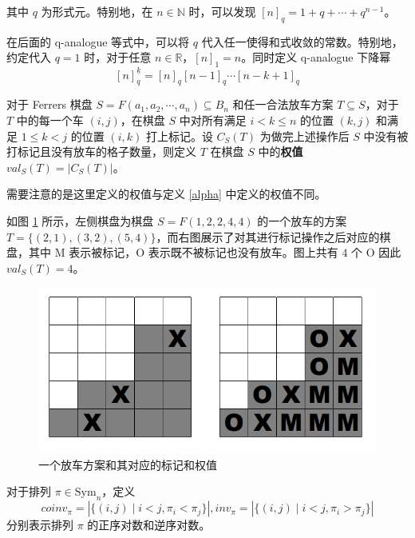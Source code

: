 \documentclass{noithesis}
\begin{document}
	其中 $q$ 为形式元。特别地，在 $n \in \mathbb{N}$ 时，可以发现 $[n]_q = 1+q+\cdots+q^{n-1}$。
	
	在后面的 q-analogue 等式中，可以将 $q$ 代入任一使得和式收敛的常数。特别地，约定代入 $q=1$ 时，对于任意 $n \in \mathbb{R}$，$[n]_1 = n$。同时定义 q-analogue 下降幂 $$[n]_q^{\underline k} = [n]_q[n-1]_q\cdots[n-k+1]_q$$
	
	\begin{definition}
		对于 Ferrers 棋盘 $S = F(a_1,a_2,\cdots,a_n) \subseteq B_n$ 和任一合法放车方案 $T \subseteq S$，对于 $T$ 中的每一个车 $(i,j)$，在棋盘 $S$ 中对所有满足 $i < k \leq n$ 的位置 $(k,j)$ 和满足 $1 \leq k < j$ 的位置 $(i,k)$ 打上标记。设 $C_S(T)$ 为做完上述操作后 $S$ 中没有被打标记且没有放车的格子数量，则定义 $T$ 在棋盘 $S$ 中的\textbf{权值} $val_S(T) = |C_S(T)|$。
	\end{definition}
	
	需要注意的是这里定义的权值与定义 \ref{alpha} 中定义的权值不同。
	
	如图 \ref{f12} 所示，左侧棋盘为棋盘 $S = F(1,2,2,4,4)$ 的一个放车的方案 $T=\{(2,1),(3,2),(5,4)\}$，而右图展示了对其进行标记操作之后对应的棋盘，其中 M 表示被标记，O 表示既不被标记也没有放车。图上共有 $4$ 个 O 因此 $val_S(T) = 4$。
	
	\begin{figure}[h]
		\centering
		\caption{一个放车方案和其对应的标记和权值}
		\label{f12}
		\includegraphics[scale=0.4]{picture/figure12.png}
	\end{figure}
	
	\begin{definition}
		对于排列 $\pi \in \mathrm{Sym}_n$，定义$$
		coinv_{\pi} = |\{(i,j) \mid i < j , \pi_i < \pi_j \}|,inv_{\pi} = |\{(i,j) \mid i<j,\pi_i>\pi_j \}|
		$$
		分别表示排列 $\pi$ 的正序对数和逆序对数。
	\end{definition}
\end{document}
